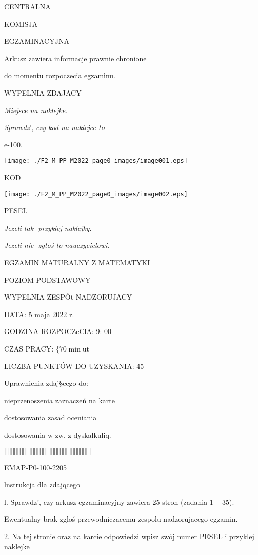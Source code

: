 \documentclass[a4paper,12pt]{article}
\begin{document}
CENTRALNA

KOMISJA

EGZAMINACYJNA

Arkusz zawiera informacje prawnie chronione

do momentu rozpoczecia egzaminu.

WYPELNIA ZDAJACY

{\it Miejsce na naklejke}.

{\it Sprawdz}', {\it czy kod na naklejce to}

e-100.
\begin{center}
\texttt{[image: ./F2\_M\_PP\_M2022\_page0\_images/image001.eps]}
\end{center}
KOD
\begin{center}
\texttt{[image: ./F2\_M\_PP\_M2022\_page0\_images/image002.eps]}
\end{center}
PESEL

{\it Jezeli tak}- {\it przyklej naklejkq}.

{\it Jezeli nie}- {\it zgtoś to nauczycielowi}.

EGZAMIN MATURALNY Z MATEMATYKI

POZIOM PODSTAWOWY

WYPELNIA ZESPÓt NADZORUJACY

DATA: 5 maja 2022 $\mathrm{r}.$

GODZINA ROZPOCZeClA: 9: 00

CZAS PRACY: $\{70 \displaystyle \min \mathrm{u}\mathrm{t}$

LICZBA PUNKTÓW DO UZYSKANIA: 45

Uprawnienia zdaj\S cego do:

\fbox{} nieprzenoszenia zaznaczeń na karte

\fbox{} dostosowania zasad oceniania

\fbox{} dostosowania w zw. z dyskalkuliq.

$\Vert\Vert\Vert\Vert\Vert\Vert\Vert\Vert\Vert\Vert\Vert\Vert\Vert\Vert\Vert\Vert\Vert\Vert\Vert\Vert\Vert\Vert\Vert\Vert\Vert\Vert\Vert\Vert\Vert\Vert|$

EMAP-P0-100-2205

lnstrukcja dla zdajqcego

l. Sprawdz', czy arkusz egzaminacyjny zawiera 25 stron (zadania $1-35$).

Ewentualny brak zgloś przewodniczacemu zespolu nadzorujacego egzamin.

2. Na tej stronie oraz na karcie odpowiedzi wpisz swój numer PESEL i przyklej naklejke
\end{document}
